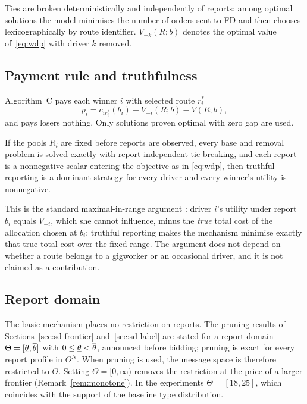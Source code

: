 Ties are broken deterministically and independently of reports: among
optimal solutions the model minimises the number of orders sent to FD and
then chooses lexicographically by route identifier. $V_{-k}(R;b)$ denotes the
optimal value of~\eqref{eq:wdp} with driver $k$ removed.

\subsection{Payment rule and truthfulness}

Algorithm~C pays each winner $i$ with selected route $r_i^\ast$
\begin{equation}
p_i=c_{ir_i^\ast}(b_i)+V_{-i}(R;b)-V(R;b),
\label{eq:payment}
\end{equation}
and pays losers nothing. Only solutions proven optimal with zero gap are
used.

\begin{proposition}
\label{prop:dsic}
If the pools $R_i$ are fixed before reports are observed, every base and
removal problem is solved exactly with report-independent tie-breaking, and
each report is a nonnegative scalar entering the objective as in
\eqref{eq:wdp}, then truthful reporting is a dominant strategy for every
driver and every winner's utility is nonnegative.
\end{proposition}

This is the standard maximal-in-range argument
\citep{nisan2007computationally}: driver $i$'s utility under
report $b_i$ equals $V_{-i}$, which she cannot influence, minus the
\emph{true} total cost of the allocation chosen at $b_i$; truthful reporting
makes the mechanism minimise exactly that true total cost over the fixed
range. The argument does not depend on whether a route belongs to a
gigworker or an occasional driver, and it is not claimed as a contribution.

\subsection{Report domain}
\label{sec:reportdomain}

The basic mechanism places no restriction on reports. The pruning results of
Sections~\ref{sec:sd-frontier} and~\ref{sec:sd-label} are stated for a report
domain $\Theta=[\underline{\theta},\overline{\theta}]$ with $0\le\underline{\theta}<\overline{\theta}$, announced before bidding;
pruning is exact for every report profile in $\Theta^N$. When pruning is
used, the message space is therefore restricted to $\Theta$. Setting
$\Theta=[0,\infty)$ removes the restriction at the price of a larger frontier
(Remark~\ref{rem:monotone}). In the experiments $\Theta=[18,25]$, which
coincides with the support of the baseline type distribution.

